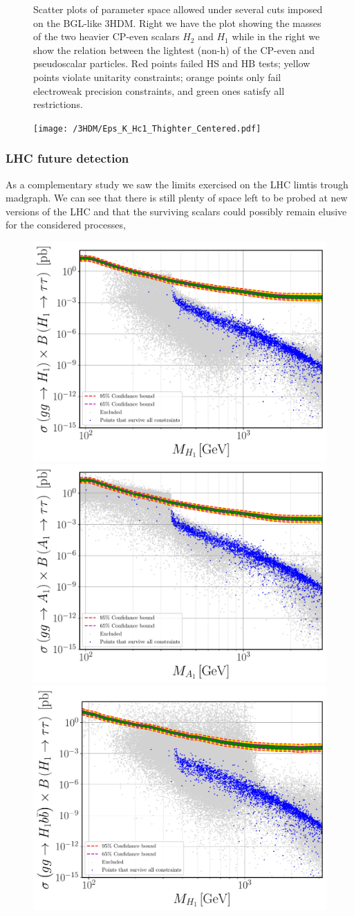 \begin{figure}[H]
	\caption{Scatter plots of parameter space allowed under  several cuts imposed on the BGL-like 3HDM. Right we have the plot showing the masses of the two heavier CP-even scalars $H_2$ and $H_1$ while in the right we show the relation between the lightest
(non-h) of the CP-even and pseudoscalar particles. Red points failed HS and HB tests; yellow points violate unitarity constraints; orange points only fail electroweak precision constraints, and green ones satisfy all restrictions.}
	\label{fig:PT_plots_H1}
\end{figure}	

\begin{figure}[H]
	\centering
	\texttt{[image: /3HDM/Eps\_K\_Hc1\_Thighter\_Centered.pdf]}
	\caption{}
	\label{fig:STU_3}
\end{figure}	


\subsubsection{LHC future detection}

As a complementary study we saw the limits exercised on the LHC limtis trough madgraph. 
%
We can see that there is still plenty of space left to be probed at new versions of the LHC and that the surviving scalars could possibly remain elusive for the considered processes, 

\begin{figure}[H]
	\centering
	\includegraphics[width=.49\textwidth]{Images/3HDM/Xsec/Xsec_1_Grey_tight.pdf}	\includegraphics[width=.49\textwidth]{Images/3HDM/Xsec/Xsec_2_Colourful_tight.pdf}
	\includegraphics[width=.49\textwidth]{Images/3HDM/Xsec/Xsec_3_Grey_Thight.pdf}
	\caption{}
	\label{}
\end{figure}	

